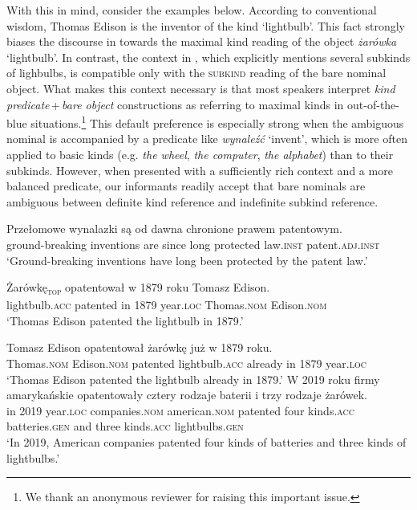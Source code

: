 \documentclass[output=paper]{langscibook}
\begin{document}
\noindent
With this in mind, consider the  examples below. According to conventional wisdom, Thomas Edison is the inventor of the kind `lightbulb'. This fact strongly biases the discourse in  towards the maximal kind reading of the object \textit{żarówka} `lightbulb'. In contrast, the context in , which explicitly mentions several subkinds of lighbulbs, is compatible only with the \textsc{subkind} reading of the bare nominal object. What makes this context necessary is that most  speakers interpret \textit{kind predicate}\,+\,\textit{bare object} constructions as referring to maximal kinds in out-of-the-blue situations.\footnote{We thank an anonymous reviewer for raising this important issue.} This default preference is especially strong when the ambiguous nominal is accompanied by a predicate like \textit{wynaleźć} `invent', which is more often applied to basic kinds (e.g. \textit{the wheel}, \textit{the computer}, \textit{the alphabet}) than to their subkinds. However, when presented with a sufficiently rich context and a more balanced predicate, our informants readily accept that  bare nominals are ambiguous between definite kind reference and indefinite subkind reference.\largerpage


\ea \label{ex:lightbulb_kind}
\gll
Przełomowe wynalazki są od dawna chronione prawem patentowym.\\
ground-breaking inventions are since long protected law.\textsc{inst} patent.\textsc{adj.inst}\\
\glt `Ground-breaking inventions have long been protected by the patent law.'

\ea \label{ex:lightbulb_kind_1}
\gll
Żarówkę\textsubscript{\textsc{top}} opatentował w 1879 roku Tomasz Edison.\\
lightbulb.\textsc{acc} patented in 1879 year.\textsc{loc} Thomas.\textsc{nom} Edison.\textsc{nom}\\
\glt `Thomas Edison patented the lightbulb in 1879.'

\ex \label{ex:lightbulb_kind_2}
\gll
Tomasz Edison opatentował żarówkę już w 1879 roku.\\
Thomas.\textsc{nom} Edison.\textsc{nom} patented lightbulb.\textsc{acc} already in 1879 year.\textsc{loc}\\
\glt `Thomas Edison patented the lightbulb already in 1879.'
\z \ex \label{ex:lightbulb_subkind}
\gll
W 2019 roku firmy amarykańskie opatentowały cztery rodzaje baterii i trzy rodzaje żarówek.\\
in 2019 year.\textsc{loc} companies.\textsc{nom} american.\textsc{nom} patented four kinds.\textsc{acc} batteries.\textsc{gen} and three kinds.\textsc{acc} lightbulbs.\textsc{gen}\\
\glt `In 2019, American companies patented four kinds of batteries and three kinds of lightbulbs.'
\end{document}
